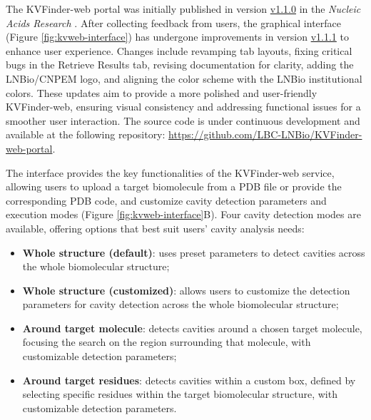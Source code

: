 \documentclass[Ingles]{phdthesis}
\begin{document}
The KVFinder-web portal was initially published in version \href{https://github.com/LBC-LNBio/KVFinder-web-portal/releases/tag/v1.1.0}{v1.1.0} in the \textit{Nucleic Acids Research} \cite{guerra2023A}. After collecting feedback from users, the graphical interface (Figure \ref{fig:kvweb-interface}) has undergone improvements in version \href{https://github.com/LBC-LNBio/KVFinder-web-portal/releases/tag/v1.1.1}{v1.1.1} to enhance user experience. Changes include revamping tab layouts, fixing critical bugs in the Retrieve Results tab, revising documentation for clarity, adding the LNBio/CNPEM logo, and aligning the color scheme with the LNBio institutional colors. These updates aim to provide a more polished and user-friendly KVFinder-web, ensuring visual consistency and addressing functional issues for a smoother user interaction. The source code is under continuous development and available at the following repository: \url{https://github.com/LBC-LNBio/KVFinder-web-portal}.
 

The interface provides the key functionalities of the KVFinder-web service, allowing users to upload a target biomolecule from a \acs{PDB} file or provide the corresponding \acs{PDB} code, and customize cavity detection parameters and execution modes (Figure \ref{fig:kvweb-interface}B). Four cavity detection modes are available, offering options that best suit users' cavity analysis needs:

\begin{itemize}
  \item \textbf{Whole structure (default)}: uses preset parameters to detect cavities across the whole biomolecular structure;
  \item \textbf{Whole structure (customized)}: allows users to customize the detection parameters for cavity detection across the whole biomolecular structure;
  \item \textbf{Around target molecule}: detects cavities around a chosen target molecule, focusing the search on the region surrounding that molecule, with customizable detection parameters;
  \item \textbf{Around target residues}: detects cavities within a custom box, defined by selecting specific residues within the target biomolecular structure, with customizable detection parameters.
\end{itemize}
\end{document}
